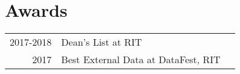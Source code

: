 \documentclass[]{deedy-resume-openfont}
\begin{document}
\begin{minipage}[t]{0.66\textwidth}
\sectionsep


\section{Awards}
\begin{tabular}{rll}
2017-2018	   & Dean's List at RIT \\
2017	   & Best External Data at DataFest, RIT \\
\end{tabular}
\sectionsep

\sectionsep

\end{minipage}
\end{document}
